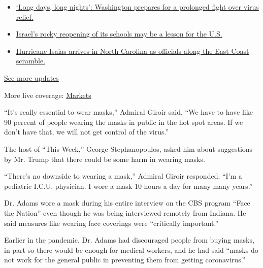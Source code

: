 \begin{itemize}
\tightlist
\item
  \href{https://www.nytimes.com/2020/08/04/world/coronavirus-covid-19.html?action=click\&pgtype=Article\&state=default\&region=MAIN_CONTENT_1\&context=storylines_live_updates\#link-6b644638}{`Long
  days, long nights': Washington prepares for a prolonged fight over
  virus relief.}
\item
  \href{https://www.nytimes.com/2020/08/04/world/coronavirus-covid-19.html?action=click\&pgtype=Article\&state=default\&region=MAIN_CONTENT_1\&context=storylines_live_updates\#link-7af9fca0}{Israel's
  rocky reopening of its schools may be a lesson for the U.S.}
\item
  \href{https://www.nytimes.com/2020/08/04/world/coronavirus-covid-19.html?action=click\&pgtype=Article\&state=default\&region=MAIN_CONTENT_1\&context=storylines_live_updates\#link-33bf9168}{Hurricane
  Isaias arrives in North Carolina as officials along the East Coast
  scramble.}
\end{itemize}

\href{https://www.nytimes.com/2020/08/04/world/coronavirus-covid-19.html?action=click\&pgtype=Article\&state=default\&region=MAIN_CONTENT_1\&context=storylines_live_updates}{See
more updates}

More live coverage:
\href{https://www.nytimes.com/live/2020/08/03/business/stock-market-today-coronavirus?action=click\&pgtype=Article\&state=default\&region=MAIN_CONTENT_1\&context=storylines_live_updates}{Markets}

``It's really essential to wear masks,'' Admiral Giroir said. ``We have
to have like 90 percent of people wearing the masks in public in the hot
spot areas. If we don't have that, we will not get control of the
virus.''

The host of ``This Week,'' George Stephanopoulos, asked him about
suggestions by Mr. Trump that there could be some harm in wearing masks.

``There's no downside to wearing a mask,'' Admiral Giroir responded.
``I'm a pediatric I.C.U. physician. I wore a mask 10 hours a day for
many many years.''

Dr. Adams wore a mask during his entire interview on the CBS program
``Face the Nation'' even though he was being interviewed remotely from
Indiana. He said measures like wearing face coverings were ``critically
important.''

Earlier in the pandemic, Dr. Adams had discouraged people from buying
masks, in part so there would be enough for medical workers, and he had
said ``masks do not work for the general public in preventing them from
getting coronavirus.''

